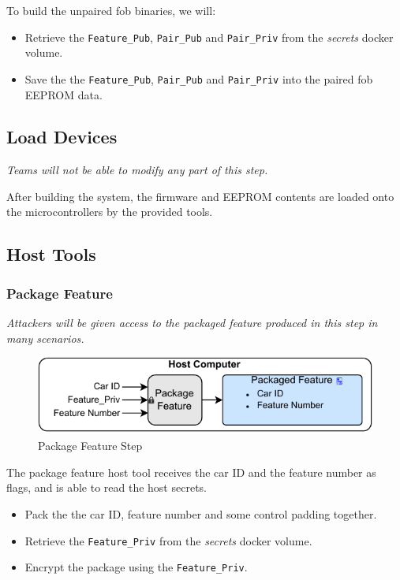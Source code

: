 \documentclass[11pt,oneside,onecolumn,letterpaper]{article}
\begin{document}
To build the unpaired fob binaries, we will:
\begin{itemize}
	\item Retrieve the \verb|Feature_Pub|, \verb|Pair_Pub| and \verb|Pair_Priv| from the \textit{secrets} docker volume.
	\item Save the the \verb|Feature_Pub|, \verb|Pair_Pub| and \verb|Pair_Priv| into the paired fob EEPROM data.
\end{itemize}

\subsection{Load Devices}

\textit{Teams will not be able to modify any part of this step.}

After building the system, the firmware and EEPROM contents are loaded onto the microcontrollers by the provided tools.

\subsection{Host Tools}

\subsubsection{Package Feature}

\textit{Attackers will be given access to the packaged feature produced in this step in many scenarios.}

\begin{figure}[!htbp]
	\begin{centering}
		\includegraphics[width = .6\textwidth]{pic/package_feature.pdf}
		\caption{Package Feature Step}
		\label{fig:package_feature}
	\end{centering}
\end{figure}

The package feature host tool receives the car ID and the feature number as flags, and is able to read the host secrets.
\begin{itemize}
	\item Pack the the car ID, feature number and some control padding together.
	\item Retrieve the \verb|Feature_Priv| from the \textit{secrets} docker volume.
	\item Encrypt the package using the \verb|Feature_Priv|.
\end{itemize}
\end{document}
